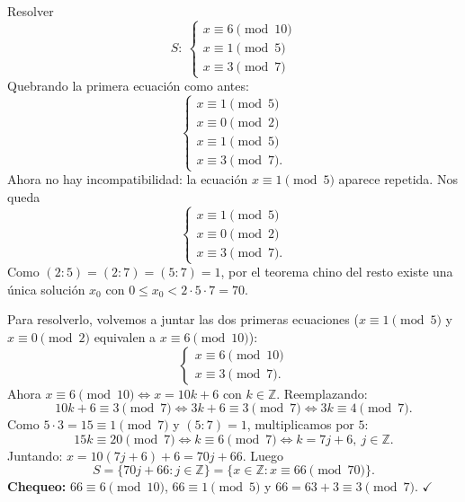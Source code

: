 \begin{ejemplo}
Resolver
\[
S:\ \begin{cases}
x\equiv 6 \pmod{10}\\
x\equiv 1 \pmod{5}\\
x\equiv 3 \pmod{7}
\end{cases}
\]
Quebrando la primera ecuación como antes:
\[
\begin{cases}
x\equiv 1 \pmod 5\\
x\equiv 0 \pmod 2\\
x\equiv 1 \pmod 5\\
x\equiv 3 \pmod 7.
\end{cases}
\]
Ahora no hay incompatibilidad: la ecuación $x\equiv 1 \pmod 5$ aparece repetida.
Nos queda
\[
\begin{cases}
x\equiv 1 \pmod 5\\
x\equiv 0 \pmod 2\\
x\equiv 3 \pmod 7.
\end{cases}
\]
Como $(2:5)=(2:7)=(5:7)=1$, por el teorema chino del resto existe una única
solución $x_0$ con $0\le x_0<2\cdot 5\cdot 7=70$.

Para resolverlo, volvemos a juntar las dos primeras ecuaciones
($x\equiv 1 \pmod 5$ y $x\equiv 0 \pmod 2$ equivalen a $x\equiv 6 \pmod{10}$):
\[
\begin{cases}
x\equiv 6 \pmod{10}\\
x\equiv 3 \pmod 7.
\end{cases}
\]
Ahora $x\equiv 6 \pmod{10} \iff x=10k+6$ con $k\in\mathbb{Z}$. Reemplazando:
\[
10k+6\equiv 3 \pmod 7 \iff 3k+6\equiv 3 \pmod 7 \iff 3k\equiv 4 \pmod 7.
\]
Como $5\cdot 3=15\equiv 1 \pmod 7$ y $(5:7)=1$, multiplicamos por $5$:
\[
15k\equiv 20 \pmod 7 \iff k\equiv 6 \pmod 7 \iff k=7j+6,\ j\in\mathbb{Z}.
\]
Juntando: $x=10(7j+6)+6=70j+66$. Luego
\[
S=\{70j+66 : j\in\mathbb{Z}\}=\{x\in\mathbb{Z} : x\equiv 66 \pmod{70}\}.
\]
\textbf{Chequeo:} $66\equiv 6 \pmod{10}$, $66\equiv 1 \pmod 5$ y
$66=63+3\equiv 3 \pmod 7$. $\checkmark$
\end{ejemplo}

